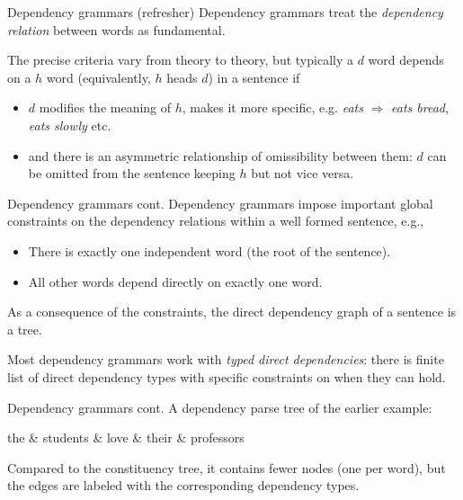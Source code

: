 \documentclass[style=upen, size=14pt]{powerdot}
\newcommand{\gold}{\color{arany}}
\theoremstyle{definition}
\begin{document}
\begin{slide}[toc={Dep. grammars}]{Dependency grammars (refresher)}
  Dependency grammars treat the \emph{\gold dependency relation}
  between words as fundamental.

  The precise criteria vary from theory to theory,
  but typically a $d$ word depends on a $h$ word (equivalently, $h$ heads $d$)
  in a sentence if
  \begin{itemize}
  \item $d$ modifies the meaning of $h$, makes it more specific, e.g.
    \emph{eats} $\Rightarrow$ \emph{eats bread}, \emph{eats slowly} etc.
  \item and there is an asymmetric relationship of omissibility between them:
    $d$ can be omitted from the sentence keeping $h$ but not vice versa.
  \end{itemize}
\end{slide}

\begin{slide}[toc=]{Dependency grammars cont.}
  Dependency grammars impose important global constraints on the dependency
  relations within a well formed sentence, e.g., 
  
  \begin{itemize}
  \item There is exactly one independent word (the root of the sentence).
  \item All other words depend directly on exactly one word.
  \end{itemize}
  As a consequence of the constraints, the direct dependency graph of a sentence is a tree.

  Most dependency grammars work with \emph{typed direct dependencies}: there is
  finite list of direct dependency types with specific constraints on when they
  can hold.
\end{slide}


\begin{slide}[toc=]{Dependency grammars cont.}
  A dependency parse tree of the earlier example:
  \begin{center}
    \begin{dependency}[theme=simple, edge style={white}, label style={text=white}]
      \begin{deptext}[column sep=1em, nodes={text=white}]
        the \& students \& love \& their \& professors \\
      \end{deptext}
    \end{dependency}
  \end{center}
  Compared to the constituency tree, it contains fewer nodes (one per word), but
  the edges are labeled with the corresponding dependency types.
\end{slide}
\end{document}
